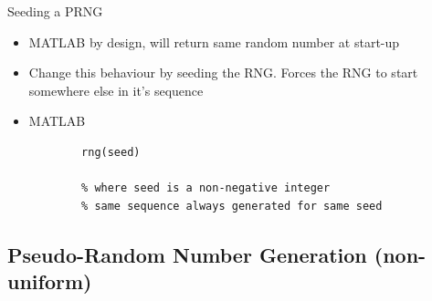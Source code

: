 Seeding a PRNG

\begin{itemize}
    \item MATLAB by design, will return same random number at start-up

    \item Change this behaviour by seeding the RNG. Forces the RNG to start somewhere else in it's sequence

    \item MATLAB

    \begin{verbatim}
        rng(seed)

        % where seed is a non-negative integer
        % same sequence always generated for same seed
    \end{verbatim}
\end{itemize}

\subsection{Pseudo-Random Number Generation (non-uniform)}

